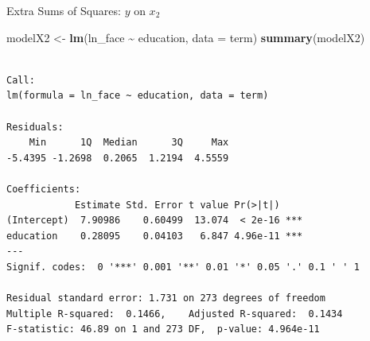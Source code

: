 \documentclass[
  ignorenonframetext,
]{beamer}
\newenvironment{Shaded}{\begin{snugshade}}{\end{snugshade}}
\newcommand{\AttributeTok}[1]{\textcolor[rgb]{0.13,0.29,0.53}{#1}}
\newcommand{\FunctionTok}[1]{\textcolor[rgb]{0.13,0.29,0.53}{\textbf{#1}}}
\newcommand{\NormalTok}[1]{#1}
\newcommand{\OtherTok}[1]{\textcolor[rgb]{0.56,0.35,0.01}{#1}}
\newcommand{\SpecialCharTok}[1]{\textcolor[rgb]{0.81,0.36,0.00}{\textbf{#1}}}
\begin{document}
\begin{frame}[fragile]{Extra Sums of Squares: \(y\) on \(x_2\)}
\label{extra-sums-of-squares-y-on-x_2}
\footnotesize

\begin{Shaded}
\begin{Highlighting}[]
\NormalTok{modelX2 }\OtherTok{\textless{}{-}} \FunctionTok{lm}\NormalTok{(ln\_face }\SpecialCharTok{\textasciitilde{}}\NormalTok{ education, }\AttributeTok{data =}\NormalTok{ term)}
\FunctionTok{summary}\NormalTok{(modelX2)}
\end{Highlighting}
\end{Shaded}

\begin{verbatim}

Call:
lm(formula = ln_face ~ education, data = term)

Residuals:
    Min      1Q  Median      3Q     Max 
-5.4395 -1.2698  0.2065  1.2194  4.5559 

Coefficients:
            Estimate Std. Error t value Pr(>|t|)    
(Intercept)  7.90986    0.60499  13.074  < 2e-16 ***
education    0.28095    0.04103   6.847 4.96e-11 ***
---
Signif. codes:  0 '***' 0.001 '**' 0.01 '*' 0.05 '.' 0.1 ' ' 1

Residual standard error: 1.731 on 273 degrees of freedom
Multiple R-squared:  0.1466,    Adjusted R-squared:  0.1434 
F-statistic: 46.89 on 1 and 273 DF,  p-value: 4.964e-11
\end{verbatim}

\normalsize
\end{frame}
\end{document}
